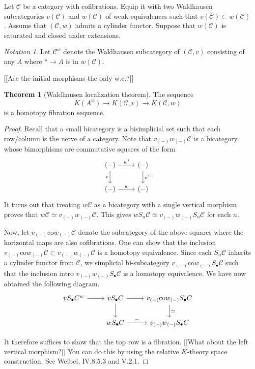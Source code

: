 \documentclass[10pt,letterpaper,cm]{nupset}
\theoremstyle{definition}
\theoremstyle{theorem}
\newtheorem{theorem}{Theorem}
\theoremstyle{remark}
\newtheorem*{notation}{Notation}
\newcommand{\1}{\mathbf{1}}
\renewcommand{\c}{\mathscr{C}}
\newcommand{\0}{\vec 0}
\begin{document}
Let $\c$ be a category with cofibrations. Equip it with two Waldhausen subcategories $v(\c)$ and $w(\c)$ of weak equivalences such that $v(\c) \subset w(\c)$. Assume that $(\c, w)$ admits a cylinder functor. Suppose that $w(\c)$ is saturated and closed under extensions. 
\begin{notation}
Let $\c^w$ denote the Waldhausen subcategory of $(\c, v)$ consisting of any $A$ where $\ast \to A$ is in $w(\c)$.
\end{notation} {[[Are the initial morphisms the only w.e.?]]}

\begin{theorem}[Waldhausen localization theorem]
The sequence $$ K(A^w) \to K(\c, v) \to K(\c, w) $$ is a homotopy fibration sequence.
\end{theorem}
\begin{proof}
Recall that a small bicategory is a bisimplicial set such that each row/column is the nerve of a category. Note that $v_{(-)}w_{(-)}\c$ is a bicategory whose bimorphisms are commutative squares of the form
\[
\begin{tikzcd}
(-) \arrow[r, "w'"] \arrow[d, "v"'] & (-) \arrow[d, "v'"] \\
(-) \arrow[r, "w"] & (-)
\end{tikzcd}.
\]
It turns out that treating $w \c$ as a bicategory with a single vertical morphism proves that $w \c \simeq v_{(-)}w_{(-)}\c$. This gives $wS_n \c \simeq v_{(-)}w_{(-)}S_n\c$ for each $n$.

\medskip

 Now, let $v_{(-)}\text{co}w_{(-)}\c$ denote the subcategory of the above squares where the horizontal maps are also cofibrations. One can show that the inclusion $v_{(-)}\text{co}w_{(-)}\c \subset v_{(-)}w_{(-)}\c$ is a homotopy equivalence. Since each $S_n \c$ inherits a cylinder functor from $\c$, we simplicial bi-subcategory $v_{(-)}\text{co}w_{(-)}S_{\bullet}\c$ such that the inclusion intro $v_{(-)}w_{(-)}S_{\bullet}\c$ is a homotopy equivalence. We have now obtained the following diagram.
\[
\begin{tikzcd}
vS_{\bullet}C^w \arrow[r] & vS_{\bullet}C \arrow[r] \arrow[d] & v_{(-)}\text{co}w_{(-)}S_{\bullet}C \arrow[d, "\simeq"] \\
 & wS_{\bullet}C \arrow[r, "\simeq"] & v_{(-)}w_{(-)}S_{\bullet}C
\end{tikzcd}
\]

\medskip

 It therefore suffices to show that the top row is a fibration. {[[What about the left vertical morphism?]]} You can do this by using the relative $K$-theory space construction. See Weibel, IV.8.5.3 and V.2.1.
\end{proof}
\end{document}
